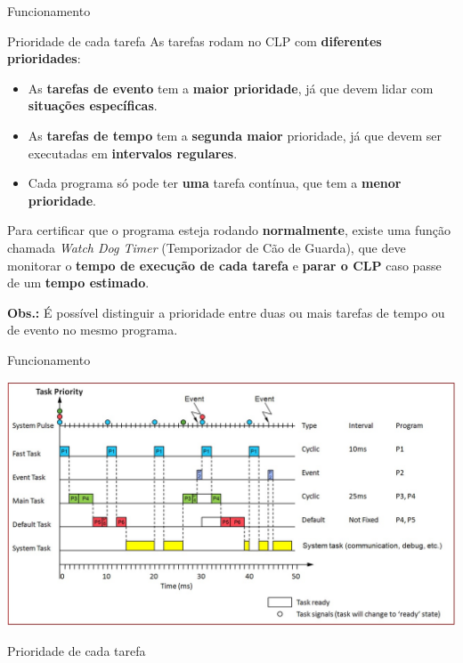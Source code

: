 \begin{frame}{Funcionamento}
	\begin{block}{Prioridade de cada tarefa}
		As tarefas rodam no CLP com \textbf{diferentes prioridades}:
		\begin{itemize}
			\item As \textbf{tarefas de evento} tem a \textbf{maior prioridade}, já que devem lidar com \textbf{situações específicas}.
			\item As \textbf{tarefas de tempo} tem a \textbf{segunda maior} prioridade, já que devem ser executadas em \textbf{intervalos regulares}.
			\item Cada programa só pode ter \textbf{uma} tarefa contínua, que tem a \textbf{menor prioridade}.
		\end{itemize}
		Para certificar que o programa esteja rodando \textbf{normalmente}, existe uma função chamada \textit{Watch Dog Timer} (Temporizador de Cão de Guarda), que deve monitorar o \textbf{tempo de execução de cada tarefa} e \textbf{parar o CLP} caso passe de um \textbf{tempo estimado}.
		
		\medskip
		
		\textbf{Obs.:} É possível distinguir a prioridade entre duas ou mais tarefas de tempo ou de evento no mesmo programa.
	\end{block}
\end{frame}


\begin{frame}{Funcionamento}
	\centering
	
	\includegraphics[height=0.8\textheight]{Figuras/Ch09/fig4}
	
	Prioridade de cada tarefa
\end{frame}


